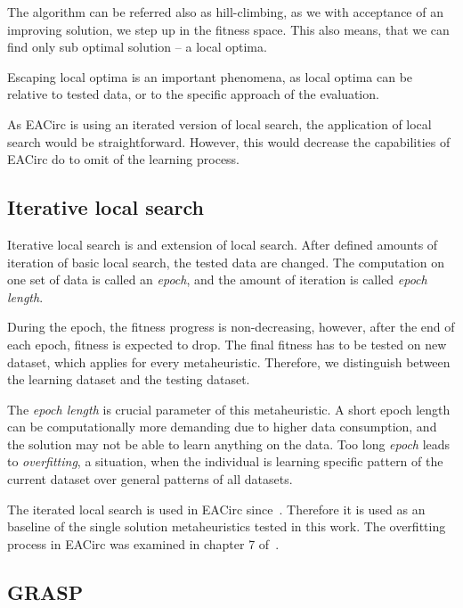 \documentclass[
  print, %
  Table,   %
  nolof,     %
  nolot,     %
  11pt, %
  oneside  %
]{fithesis3}
\begin{document}
The algorithm can be referred also as hill-climbing, as we with acceptance of an improving solution, we step up in the fitness space. This also means, that we can find only sub optimal solution -- a local optima.

Escaping local optima is an important phenomena, as local optima can be relative to tested data, or to the specific approach of the evaluation.

As EACirc is using an iterated version of local search, the application of local search would be straightforward. However, this would decrease the capabilities of EACirc do to omit of the learning process.

\subsection{Iterative local search}
\label{subsec:opt-single-sol-ils}

Iterative local search is and extension of local search. After defined amounts of iteration of basic local search, the tested data are changed. The computation on one set of data is called an \textit{epoch}, and the amount of iteration is called \textit{epoch length}.

During the epoch, the fitness progress is non-decreasing, however, after the end of each epoch, fitness is expected to drop. The final fitness has to be tested on new dataset, which applies for every metaheuristic. Therefore, we distinguish between the learning dataset and the testing dataset.

The \textit{epoch length} is crucial parameter of this metaheuristic. A short epoch length can be computationally more demanding due to higher data consumption, and the solution may not be able to learn anything on the data. Too long \textit{epoch} leads to \textit{overfitting}, a situation, when the individual is learning specific pattern of the current dataset over general patterns of all datasets.

The iterated local search is used in EACirc since~\cite{sys2014constructing}. Therefore it is used as an baseline of the single solution metaheuristics tested in this work. The overfitting process in EACirc was examined in chapter 7 of~\cite{ukropBcThesis}.

\subsection{GRASP}
\label{subsec:opt-single-sol-grasp}
\end{document}
